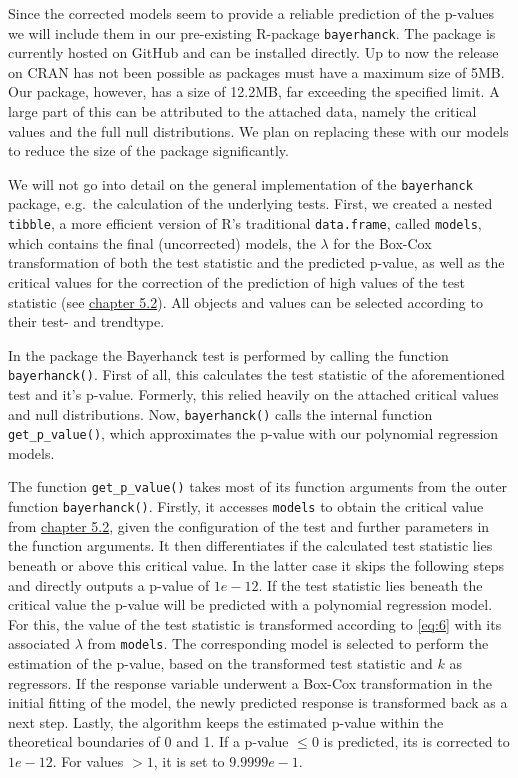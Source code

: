 \documentclass[12pt,a4paper]{article}
\begin{document}
Since the corrected models seem to provide a reliable prediction of the
p-values we will include them in our pre-existing R-package
\texttt{bayerhanck}. The package is currently hosted on GitHub and can
be installed directly. Up to now the release on CRAN has not been
possible as packages must have a maximum size of 5MB. Our package,
however, has a size of 12.2MB, far exceeding the specified limit. A
large part of this can be attributed to the attached data, namely the
critical values and the full null distributions. We plan on replacing
these with our models to reduce the size of the package significantly.

We will not go into detail on the general implementation of the
\texttt{bayerhanck} package, e.g.~the calculation of the underlying
tests. First, we created a nested \texttt{tibble}, a more efficient
version of R's traditional \texttt{data.frame}, called \texttt{models},
which contains the final (uncorrected) models, the \(\lambda\) for the
Box-Cox transformation of both the test statistic and the predicted
p-value, as well as the critical values for the correction of the
prediction of high values of the test statistic (see
\protect\hyperlink{correction-for-high-values-of-the-test-statistic}{chapter
5.2}). All objects and values can be selected according to their test-
and trendtype.

In the package the Bayerhanck test is performed by calling the function
\texttt{bayerhanck()}. First of all, this calculates the test statistic
of the aforementioned test and it's p-value. Formerly, this relied
heavily on the attached critical values and null distributions. Now,
\texttt{bayerhanck()} calls the internal function
\texttt{get\_p\_value()}, which approximates the p-value with our
polynomial regression models.

The function \texttt{get\_p\_value()} takes most of its function
arguments from the outer function \texttt{bayerhanck()}. Firstly, it
accesses \texttt{models} to obtain the critical value from
\protect\hyperlink{correction-for-high-values-of-the-test-statistic}{chapter
5.2}, given the configuration of the test and further parameters in the
function arguments. It then differentiates if the calculated test
statistic lies beneath or above this critical value. In the latter case
it skips the following steps and directly outputs a p-value of
\(1e-12\). If the test statistic lies beneath the critical value the
p-value will be predicted with a polynomial regression model. For this,
the value of the test statistic is transformed according to \ref{eq:6}
with its associated \(\lambda\) from \texttt{models}. The corresponding
model is selected to perform the estimation of the p-value, based on the
transformed test statistic and \(k\) as regressors. If the response
variable underwent a Box-Cox transformation in the initial fitting of
the model, the newly predicted response is transformed back as a next
step. Lastly, the algorithm keeps the estimated p-value within the
theoretical boundaries of 0 and 1. If a p-value \(\leq 0\) is predicted,
its is corrected to \(1e-12\). For values \(> 1\), it is set to
\(9.9999e-1\).
\end{document}
